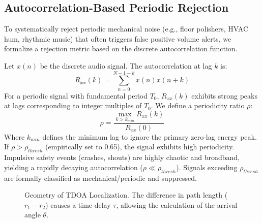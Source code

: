 \documentclass[conference]{IEEEtran}
\begin{document}
\subsection{Autocorrelation-Based Periodic Rejection}
To systematically reject periodic mechanical noise (e.g., floor polishers, HVAC hum, rhythmic music) that often triggers false positive volume alerts, we formalize a rejection metric based on the discrete autocorrelation function.

Let $x(n)$ be the discrete audio signal. The autocorrelation at lag $k$ is:
\begin{equation}
R_{xx}(k) = \sum_{n=0}^{N-1-k} x(n)x(n+k)
\end{equation}
For a periodic signal with fundamental period $T_0$, $R_{xx}(k)$ exhibits strong peaks at lags corresponding to integer multiples of $T_0$. We define a periodicity ratio $\rho$:
\begin{equation}
\rho = \frac{\max_{k > k_{min}} R_{xx}(k)}{R_{xx}(0)}
\end{equation}
Where $k_{min}$ defines the minimum lag to ignore the primary zero-lag energy peak. If $\rho > \rho_{thresh}$ (empirically set to 0.65), the signal exhibits high periodicity. Impulsive safety events (crashes, shouts) are highly chaotic and broadband, yielding a rapidly decaying autocorrelation ($\rho \ll \rho_{thresh}$). Signals exceeding $\rho_{thresh}$ are formally classified as mechanical/periodic and suppressed.

\begin{figure}[htbp]
\centering
{}
\caption{Geometry of TDOA Localization. The difference in path length ($r_1 - r_2$) causes a time delay $\tau$, allowing the calculation of the arrival angle $\theta$.}
\label{fig:tdoa}
\end{figure}
\end{document}
